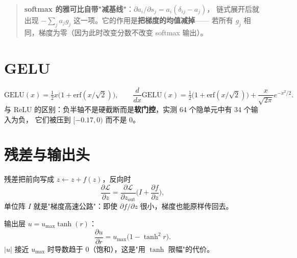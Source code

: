 \begin{quote}
\textbf{softmax 的雅可比自带"减基线"}：$\partial a_i/\partial s_j=a_i(\delta_{ij}-a_j)$，
链式展开后就出现 $-\sum_j a_j g_j$ 这一项。它的作用是\textbf{把梯度的均值减掉}——
若所有 $g_j$ 相同，梯度为零（因为此时改变分数不改变 softmax 输出）。
\end{quote}

\section{GELU}

\begin{equation}
  \mathrm{GELU}(x)=\tfrac12x\big(1+\mathrm{erf}(x/\sqrt2)\big),\qquad
  \frac{d}{dx}\mathrm{GELU}(x)=\tfrac12\big(1+\mathrm{erf}(x/\sqrt2)\big)
  +\frac{x}{\sqrt{2\pi}}e^{-x^2/2}.
\end{equation}
与 ReLU 的区别：负半轴不是硬截断而是\textbf{软门控}，实测 $64$ 个隐单元中有 $34$ 个输入为负，
它们被压到 $[-0.17,0)$ 而不是 $0$。

\section{残差与输出头}

残差把前向写成 $z\leftarrow z+f(z)$，反向时
\begin{equation}
  \frac{\partial\mathcal{L}}{\partial z}=\frac{\partial\mathcal{L}}{\partial z_{\text{out}}}
  \Big(I+\frac{\partial f}{\partial z}\Big),
\end{equation}
单位阵 $I$ 就是"梯度高速公路"：即使 $\partial f/\partial z$ 很小，梯度也能原样传回去。

输出层 $u=u_{\max}\tanh(r)$：
\begin{equation}
  \frac{\partial u}{\partial r}=u_{\max}\big(1-\tanh^2r\big).
\end{equation}
$|u|$ 接近 $u_{\max}$ 时导数趋于 $0$（饱和），这是"用 $\tanh$ 限幅"的代价。

